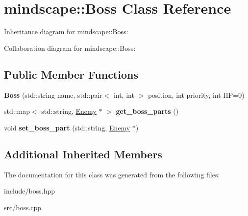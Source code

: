 \hypertarget{classmindscape_1_1_boss}{}\section{mindscape\+:\+:Boss Class Reference}
\label{classmindscape_1_1_boss}


Inheritance diagram for mindscape\+:\+:Boss\+:


Collaboration diagram for mindscape\+:\+:Boss\+:
\subsection*{Public Member Functions}
\begin{DoxyCompactItemize}
\item 
{\bfseries Boss} (std\+::string name, std\+::pair$<$ int, int $>$ position, int priority, int HP=0)\hypertarget{classmindscape_1_1_boss_af33cbd15d9179b25695dd1c9165bf4c3}{}\label{classmindscape_1_1_boss_af33cbd15d9179b25695dd1c9165bf4c3}

\item 
std\+::map$<$ std\+::string, \hyperlink{classmindscape_1_1_enemy}{Enemy} $\ast$ $>$ {\bfseries get\+\_\+boss\+\_\+parts} ()\hypertarget{classmindscape_1_1_boss_a8d557eed8f62a95182140d7f6170ed9e}{}\label{classmindscape_1_1_boss_a8d557eed8f62a95182140d7f6170ed9e}

\item 
void {\bfseries set\+\_\+boss\+\_\+part} (std\+::string, \hyperlink{classmindscape_1_1_enemy}{Enemy} $\ast$)\hypertarget{classmindscape_1_1_boss_a1f4a5e7e3d9ab6a39c607a317440aabe}{}\label{classmindscape_1_1_boss_a1f4a5e7e3d9ab6a39c607a317440aabe}

\end{DoxyCompactItemize}
\subsection*{Additional Inherited Members}


The documentation for this class was generated from the following files\+:\begin{DoxyCompactItemize}
\item 
include/boss.\+hpp\item 
src/boss.\+cpp\end{DoxyCompactItemize}
